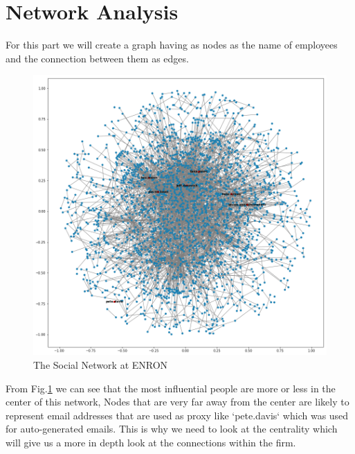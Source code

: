 \documentclass[11pt]{article}
\begin{document}
\section{Network Analysis}\label{Network Analysis}

For this part we will create a graph having as nodes as the name of employees and the connection between them as edges. 

\begin{figure}[htbp]
  \centering
  \includegraphics[width=\columnwidth]{images/social_network.png}
  \vspace{-7mm}
  \caption{The Social Network at ENRON}
  \vspace{-3mm}
  \label{fig:social_network}
\end{figure}
From Fig.\ref{fig:social_network} we can see that the most influential people are more or less in the center of this network, Nodes that are very far away from the center are likely to represent email addresses that are used as proxy like `pete.davis` which was used for auto-generated emails\cite{employee_position}. This is why we need to look at the centrality which will give us a more in depth look at the connections within the firm.
\end{document}
